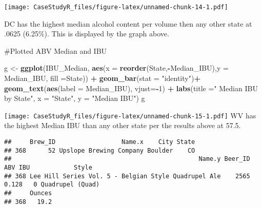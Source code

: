 \documentclass[
]{article}
\newenvironment{Shaded}{\begin{snugshade}}{\end{snugshade}}
\newcommand{\DataTypeTok}[1]{\textcolor[rgb]{0.13,0.29,0.53}{#1}}
\newcommand{\DecValTok}[1]{\textcolor[rgb]{0.00,0.00,0.81}{#1}}
\newcommand{\KeywordTok}[1]{\textcolor[rgb]{0.13,0.29,0.53}{\textbf{#1}}}
\newcommand{\NormalTok}[1]{#1}
\newcommand{\OperatorTok}[1]{\textcolor[rgb]{0.81,0.36,0.00}{\textbf{#1}}}
\newcommand{\StringTok}[1]{\textcolor[rgb]{0.31,0.60,0.02}{#1}}
\begin{document}
\texttt{[image: CaseStudyR\_files/figure-latex/unnamed-chunk-14-1.pdf]}

DC has the highest median alcohol content per volume then any other
state at .0625 (6.25\%). This is displayed by the graph above.

\#Plotted ABV Median and IBU

\begin{Shaded}
\begin{Highlighting}[]
\NormalTok{g <-}\StringTok{ }\KeywordTok{ggplot}\NormalTok{(IBU_Median, }\KeywordTok{aes}\NormalTok{(}\DataTypeTok{x =} \KeywordTok{reorder}\NormalTok{(State,}\OperatorTok{-}\NormalTok{Median_IBU),}\DataTypeTok{y =}\NormalTok{ Median_IBU, }\DataTypeTok{fill =}\NormalTok{State)) }\OperatorTok{+}\StringTok{ }\KeywordTok{geom_bar}\NormalTok{(}\DataTypeTok{stat =} \StringTok{"identity"}\NormalTok{)}\OperatorTok{+}\StringTok{ }\KeywordTok{geom_text}\NormalTok{(}\KeywordTok{aes}\NormalTok{(}\DataTypeTok{label =}\NormalTok{ Median_IBU), }\DataTypeTok{vjust=}\OperatorTok{-}\DecValTok{1}\NormalTok{) }\OperatorTok{+}\StringTok{ }\KeywordTok{labs}\NormalTok{(}\DataTypeTok{title =}\StringTok{" Median IBU by State"}\NormalTok{, }\DataTypeTok{x =} \StringTok{"State"}\NormalTok{, }\DataTypeTok{y =} \StringTok{"Median IBU"}\NormalTok{)}
\NormalTok{g}
\end{Highlighting}
\end{Shaded}

\texttt{[image: CaseStudyR\_files/figure-latex/unnamed-chunk-15-1.pdf]}
WV has the highest Median IBU than any other state per the results above
at 57.5.

\begin{Shaded}
\end{Shaded}

\begin{verbatim}
##     Brew_ID                  Name.x    City State
## 368      52 Upslope Brewing Company Boulder    CO
##                                                   Name.y Beer_ID   ABV IBU            Style
## 368 Lee Hill Series Vol. 5 - Belgian Style Quadrupel Ale    2565 0.128   0 Quadrupel (Quad)
##     Ounces
## 368   19.2
\end{verbatim}
\end{document}
